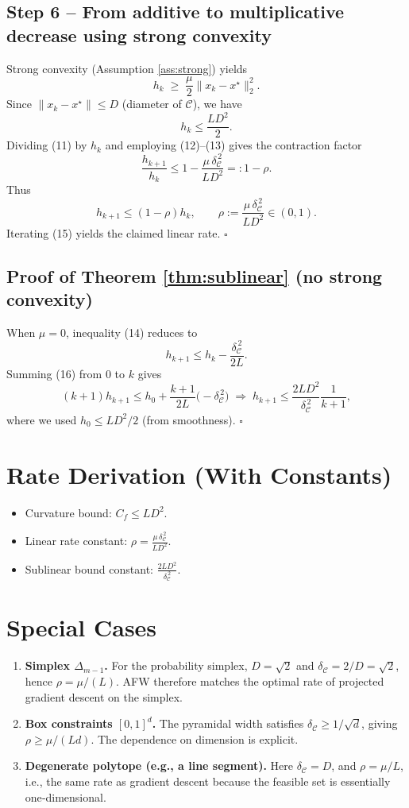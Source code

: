 \documentclass{article}
\begin{document}
\subsection*{Step 6 – From additive to multiplicative decrease using strong convexity}
Strong convexity (Assumption \ref{ass:strong}) yields
\[
h_k\;\ge\;\frac{\mu}{2}\|x_k-x^\star\|_2^2. \tag{12}
\]
Since $\|x_k-x^\star\|\le D$ (diameter of $\mathcal{C}$), we have
\[
h_k\le \frac{L D^2}{2}. \tag{13}
\]
Dividing (11) by $h_k$ and employing (12)–(13) gives the contraction factor
\[
\frac{h_{k+1}}{h_k}
\le 1-\frac{\mu\,\delta_{\mathcal{C}}^{\,2}}{L D^2}
=:1-\rho . \tag{14}
\]
Thus
\[
h_{k+1}\le (1-\rho)h_k,\qquad\rho:=\frac{\mu\,\delta_{\mathcal{C}}^{\,2}}{L D^2}\in(0,1). \tag{15}
\]
Iterating (15) yields the claimed linear rate. \hfill $\square$

\subsection*{Proof of Theorem \ref{thm:sublinear} (no strong convexity)}
When $\mu=0$, inequality (14) reduces to
\[
h_{k+1}\le h_k-\frac{\delta_{\mathcal{C}}^{\,2}}{2L}. \tag{16}
\]
Summing (16) from $0$ to $k$ gives
\[
(k+1)h_{k+1}\le h_0+\frac{k+1}{2L} \bigl(-\delta_{\mathcal{C}}^{\,2}\bigr)
\;\Longrightarrow\;
h_{k+1}\le\frac{2L D^2}{\delta_{\mathcal{C}}^{\,2}}\frac{1}{k+1},
\]
where we used $h_0\le L D^2/2$ (from smoothness). \hfill $\square$

\section*{Rate Derivation (With Constants)}
\begin{itemize}
\item Curvature bound: $C_f\le L D^2$.
\item Linear rate constant: $\displaystyle\rho=\frac{\mu\,\delta_{\mathcal{C}}^{\,2}}{L D^2}$.
\item Sublinear bound constant: $\displaystyle \frac{2L D^2}{\delta_{\mathcal{C}}^{\,2}}$.
\end{itemize}

\section*{Special Cases}
\begin{enumerate}
\item \textbf{Simplex $\Delta_{m-1}$.} For the probability simplex, $D=\sqrt{2}$ and $\delta_{\mathcal{C}}=2/D=\sqrt{2}$, hence $\rho=\mu/(L)$. AFW therefore matches the optimal rate of projected gradient descent on the simplex.
\item \textbf{Box constraints $[0,1]^d$.} The pyramidal width satisfies $\delta_{\mathcal{C}}\ge 1/\sqrt{d}$, giving $\rho\ge \mu/(L d)$. The dependence on dimension is explicit.
\item \textbf{Degenerate polytope (e.g., a line segment).} Here $\delta_{\mathcal{C}}=D$, and $\rho=\mu/L$, i.e., the same rate as gradient descent because the feasible set is essentially one‑dimensional.
\end{enumerate}
\end{document}
